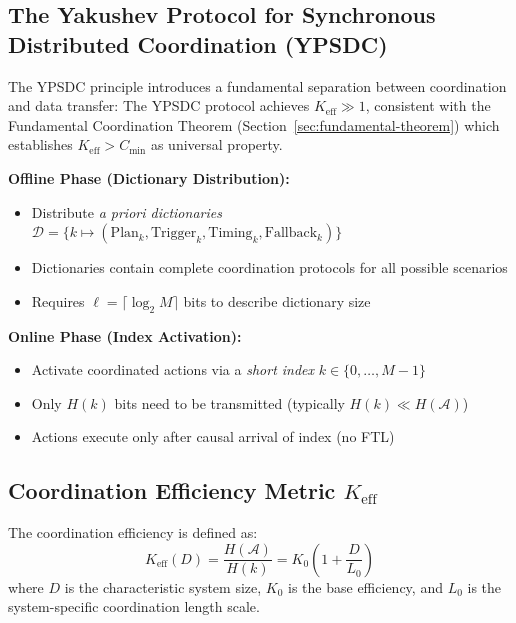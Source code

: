 \documentclass[11pt,a4paper]{article}
\begin{document}
	\subsection{The Yakushev Protocol for Synchronous Distributed Coordination (YPSDC)}
	The YPSDC principle introduces a fundamental separation between coordination and data transfer:
	The YPSDC protocol achieves $K_{\mathrm{eff}} \gg 1$, consistent with the Fundamental Coordination Theorem (Section~\ref{sec:fundamental-theorem}) which establishes $K_{\mathrm{eff}} > C_{\min}$ as universal property.
	\begin{tcolorbox}[title=YPSDC Principle, colback=blue!5!white, colframe=blue!50!black]
		\textbf{Offline Phase (Dictionary Distribution):}
		\begin{itemize}
			\item Distribute \emph{a priori dictionaries} $\mathcal{D} = \{k \mapsto (\text{Plan}_k, \text{Trigger}_k, \text{Timing}_k, \text{Fallback}_k)\}$
			\item Dictionaries contain complete coordination protocols for all possible scenarios
			\item Requires $\ell = \lceil \log_2 M \rceil$ bits to describe dictionary size
		\end{itemize}
		
		\textbf{Online Phase (Index Activation):}
		\begin{itemize}
			\item Activate coordinated actions via a \emph{short index} $k \in \{0, \dots, M-1\}$
			\item Only $H(k)$ bits need to be transmitted (typically $H(k) \ll H(\mathcal{A})$)
			\item Actions execute only after causal arrival of index (no FTL)
		\end{itemize}
	\end{tcolorbox}
	
	\subsection{Coordination Efficiency Metric \texorpdfstring{$K_{\mathrm{eff}}$}{K_eff}}
	The coordination efficiency is defined as:
	\begin{equation}
		K_{\mathrm{eff}}(D) = \frac{H(\mathcal{A})}{H(k)} = K_0 \left(1 + \frac{D}{L_0}\right)
	\end{equation}
	where $D$ is the characteristic system size, $K_0$ is the base efficiency, 
	and $L_0$ is the system-specific coordination length scale.
	
\end{document}
